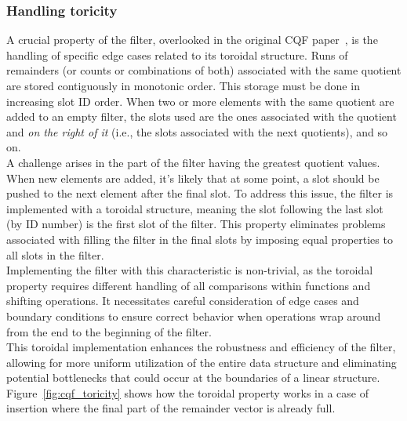 \subsubsection{Handling toricity}
A crucial property of the filter, overlooked in the original CQF paper~\cite{cqf}, is the handling of specific edge cases related to its toroidal structure. Runs of remainders (or counts or combinations of both) associated with the same quotient are stored contiguously in monotonic order. This storage must be done in increasing slot ID order. When two or more elements with the same quotient are added to an empty filter, the slots used are the ones associated with the quotient and \emph{on the right of it} (i.e., the slots associated with the next quotients), and so on.\\
A challenge arises in the part of the filter having the greatest quotient values. When new elements are added, it's likely that at some point, a slot should be pushed to the next element after the final slot. To address this issue, the filter is implemented with a toroidal structure, meaning the slot following the last slot (by ID number) is the first slot of the filter. This property eliminates problems associated with filling the filter in the final slots by imposing equal properties to all slots in the filter.\\
Implementing the filter with this characteristic is non-trivial, as the toroidal property requires different handling of all comparisons within functions and shifting operations. It necessitates careful consideration of edge cases and boundary conditions to ensure correct behavior when operations wrap around from the end to the beginning of the filter.\\
This toroidal implementation enhances the robustness and efficiency of the filter, allowing for more uniform utilization of the entire data structure and eliminating potential bottlenecks that could occur at the boundaries of a linear structure. Figure~\ref{fig:cqf_toricity} shows how the toroidal property works in a case of insertion where the final part of the remainder vector is already full.
